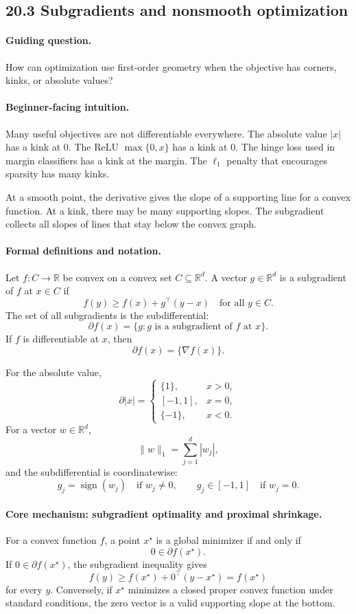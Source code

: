\subsection{20.3 Subgradients and nonsmooth optimization}

\paragraph{Guiding question.}
How can optimization use first-order geometry when the objective has corners, kinks, or absolute values?

\paragraph{Beginner-facing intuition.}
Many useful objectives are not differentiable everywhere. The absolute value \(|x|\) has a kink at \(0\). The ReLU \(\max\{0,x\}\) has a kink at \(0\). The hinge loss used in margin classifiers has a kink at the margin. The \(\ell_1\) penalty that encourages sparsity has many kinks.

At a smooth point, the derivative gives the slope of a supporting line for a convex function. At a kink, there may be many supporting slopes. The subgradient collects all slopes of lines that stay below the convex graph.

\paragraph{Formal definitions and notation.}
Let \(f:C\to\mathbb R\) be convex on a convex set \(C\subseteq\mathbb R^d\). A vector \(g\in\mathbb R^d\) is a subgradient of \(f\) at \(x\in C\) if
\[
\boxed{
f(y)\ge f(x)+g^\top(y-x)
\quad\text{for all }y\in C.
}
\]
The set of all subgradients is the subdifferential:
\[
\partial f(x)=\{g:g\text{ is a subgradient of }f\text{ at }x\}.
\]
If \(f\) is differentiable at \(x\), then
\[
\partial f(x)=\{\nabla f(x)\}.
\]

For the absolute value,
\[
\partial |x|=
\begin{cases}
\{1\}, & x>0,\\
[-1,1], & x=0,\\
\{-1\}, & x<0.
\end{cases}
\]
For a vector \(w\in\mathbb R^d\),
\[
\|w\|_1=\sum_{j=1}^d |w_j|,
\]
and the subdifferential is coordinatewise:
\[
g_j=\operatorname{sign}(w_j)\quad\text{if }w_j\neq 0,
\qquad
g_j\in[-1,1]\quad\text{if }w_j=0.
\]

\paragraph{Core mechanism: subgradient optimality and proximal shrinkage.}
For a convex function \(f\), a point \(x^\star\) is a global minimizer if and only if
\[
\boxed{0\in \partial f(x^\star).}
\]
If \(0\in\partial f(x^\star)\), the subgradient inequality gives
\[
f(y)\ge f(x^\star)+0^\top(y-x^\star)=f(x^\star)
\]
for every \(y\). Conversely, if \(x^\star\) minimizes a closed proper convex function under standard conditions, the zero vector is a valid supporting slope at the bottom.

